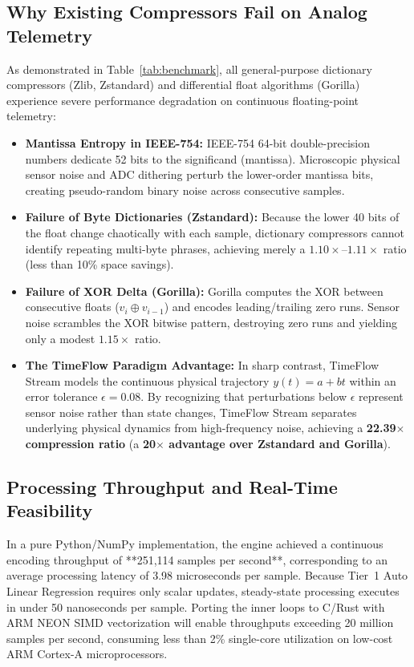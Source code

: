 \documentclass[journal]{IEEEtran}
\begin{document}
\subsection{Why Existing Compressors Fail on Analog Telemetry}
As demonstrated in Table~\ref{tab:benchmark}, all general-purpose dictionary compressors (Zlib, Zstandard) and differential float algorithms (Gorilla) experience severe performance degradation on continuous floating-point telemetry:
\begin{itemize}
    \item \textbf{Mantissa Entropy in IEEE-754:} IEEE-754 64-bit double-precision numbers dedicate 52 bits to the significand (mantissa). Microscopic physical sensor noise and ADC dithering perturb the lower-order mantissa bits, creating pseudo-random binary noise across consecutive samples.
    \item \textbf{Failure of Byte Dictionaries (Zstandard):} Because the lower 40 bits of the float change chaotically with each sample, dictionary compressors cannot identify repeating multi-byte phrases, achieving merely a $1.10\times\text{--}1.11\times$ ratio (less than 10\% space savings).
    \item \textbf{Failure of XOR Delta (Gorilla):} Gorilla computes the XOR between consecutive floats ($v_i \oplus v_{i-1}$) and encodes leading/trailing zero runs. Sensor noise scrambles the XOR bitwise pattern, destroying zero runs and yielding only a modest $1.15\times$ ratio.
    \item \textbf{The TimeFlow Paradigm Advantage:} In sharp contrast, TimeFlow Stream models the continuous physical trajectory $y(t) = a + bt$ within an error tolerance $\epsilon = 0.08$. By recognizing that perturbations below $\epsilon$ represent sensor noise rather than state changes, TimeFlow Stream separates underlying physical dynamics from high-frequency noise, achieving a \textbf{22.39$\times$ compression ratio} (a \textbf{20$\times$ advantage over Zstandard and Gorilla}).
\end{itemize}

\subsection{Processing Throughput and Real-Time Feasibility}
In a pure Python/NumPy implementation, the engine achieved a continuous encoding throughput of **251,114 samples per second**, corresponding to an average processing latency of 3.98 microseconds per sample. Because Tier~1 Auto Linear Regression requires only scalar updates, steady-state processing executes in under 50 nanoseconds per sample. Porting the inner loops to C/Rust with ARM NEON SIMD vectorization will enable throughputs exceeding 20 million samples per second, consuming less than 2\% single-core utilization on low-cost ARM Cortex-A microprocessors.
\end{document}
